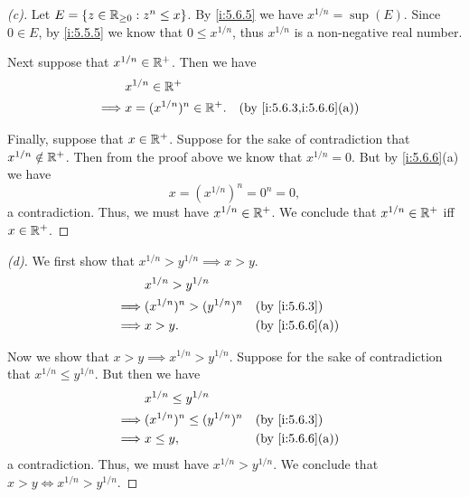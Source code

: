 \begin{proof}[(c)]
  Let \(E = \left\lbrace z \in \mathbb{R}_{\geq 0} : z^n \leq x\right\rbrace\).
  By \cref{i:5.6.5} we have \(x^{1 / n} = \sup(E)\).
  Since \(0 \in E\), by \cref{i:5.5.5} we know that \(0 \leq x^{1 / n}\), thus \(x^{1 / n}\) is a non-negative real number.

  Next suppose that \(x^{1 / n} \in \mathbb{R}^+\).
  Then we have
  \begin{align*}
             & x^{1 / n} \in \R^+                                       \\
    \implies & x = (x^{1 / n})^n \in \R^+. &  & \by{i:5.6.3,i:5.6.6}[a]
  \end{align*}

  Finally, suppose that \(x \in \mathbb{R}^+\).
  Suppose for the sake of contradiction that \(x^{1 / n} \notin \mathbb{R}^+\).
  Then from the proof above we know that \(x^{1 / n} = 0\).
  But by \cref{i:5.6.6}(a) we have
  \[
    x = (x^{1 / n})^n = 0^n = 0,
  \]
  a contradiction.
  Thus, we must have \(x^{1 / n} \in \mathbb{R}^+\).
  We conclude that \(x^{1 / n} \in \mathbb{R}^+\) iff \(x \in \mathbb{R}^+\).
\end{proof}

\begin{proof}[(d)]
  We first show that \(x^{1 / n} > y^{1 / n} \implies x > y\).
  \begin{align*}
             & x^{1 / n} > y^{1 / n}                              \\
    \implies & (x^{1 / n})^n > (y^{1 / n})^n &  & \by{i:5.6.3}    \\
    \implies & x > y.                        &  & \by{i:5.6.6}[a]
  \end{align*}

  Now we show that \(x > y \implies x^{1 / n} > y^{1 / n}\).
  Suppose for the sake of contradiction that \(x^{1 / n} \leq y^{1 / n}\).
  But then we have
  \begin{align*}
             & x^{1 / n} \leq y^{1 / n}                              \\
    \implies & (x^{1 / n})^n \leq (y^{1 / n})^n &  & \by{i:5.6.3}    \\
    \implies & x \leq y,                        &  & \by{i:5.6.6}[a]
  \end{align*}
  a contradiction.
  Thus, we must have \(x^{1 / n} > y^{1 / n}\).
  We conclude that \(x > y \iff x^{1 / n} > y^{1 / n}\).
\end{proof}

